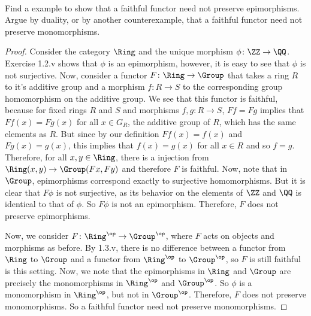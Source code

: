 \documentclass[../../main]{subfiles}
\begin{document}
\paragraph{}
\begin{exercise}
	Find a example to show that a faithful functor need not preserve
	epimorphisms. Argue by duality, or by another counterexample, that a
	faithful functor need not preserve monomorphisms.
\end{exercise}
\begin{proof}
	Consider the category $\Ring$ and the unique morphism $\phi\colon \ZZ \rightarrow
	\QQ$. Exercise 1.2.v shows that $\phi$ is an epimorphism, however, it is
	easy to see that $\phi$ is not surjective. Now, consider a functor $F\colon \Ring
	\rightarrow \Group$ that takes a ring $R$ to it's additive group and a
	morphism $f\colon R \rightarrow S$ to the corresponding group homomorphism on the
	additive group. We see that this functor is faithful, because for fixed
	rings $R$ and $S$ and morphisms $f,g \colon R \rightarrow S$, $Ff = Fg$ implies
	that $Ff(x) = Fg(x)$ for all $x \in G_R$, the additive group of $R$, which
	has the same elements as $R$. But since by our definition $Ff(x) = f(x)$ and
	$Fg(x) = g(x)$, this implies that $f(x) = g(x)$ for all $x \in R$ and so $f =
	g$. Therefore, for all $x,y \in \Ring$, there is a injection from
	$\Ring(x,y) \rightarrow \Group (Fx,Fy)$ and therefore $F$ is faithful.  Now,
	note that in $\Group$, epimorphisms correspond exactly to surjective
	homomorphisms. But it is clear that $F\phi$ is not surjective, as its
	behavior on the elements of $\ZZ$ and $\QQ$ is identical to that of $\phi$.
	So $F\phi$ is not an epimorphism. Therefore, $F$ does not preserve
	epimorphisms.

	Now, we consider $F\colon \Ring^{\op} \rightarrow \Group^{\op}$, where $F$ acts on
	objects and morphisms as before. By 1.3.v, there is no difference between a
	functor from $\Ring$ to $\Group$ and a functor from $\Ring^{\op}$ to
	$\Group^{\op}$, so $F$ is still faithful is this setting. Now, we note that
	the epimorphisms in $\Ring$ and $\Group$ are precisely the monomorphisms in
	$\Ring^{\op}$ and $\Group^{\op}$. So $\phi$ is a monomorphism in $\Ring^{\op}$,
	but not in $\Group^{\op}$. Therefore, $F$ does not preserve monomorphisms. So
	a faithful functor need not preserve monomorphisms.
\end{proof}
\end{document}
